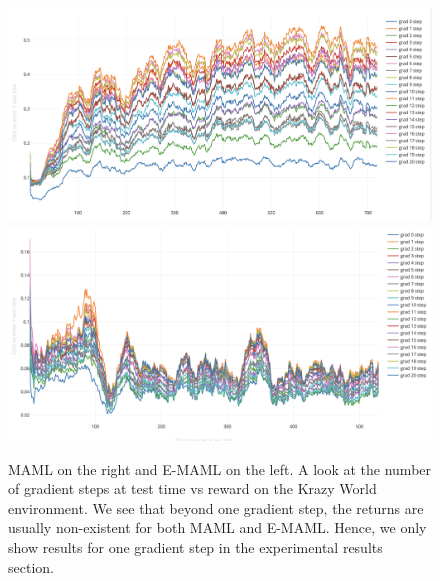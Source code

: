 \documentclass{article} %
\begin{document}
\begin{figure}[H]
\begin{center}
\includegraphics[scale=0.16]{bradly_curves/emaml-20-0.png}%
\includegraphics[scale=0.16]{bradly_curves/maml-20-0.png}
\end{center}
\caption{MAML on the right and E-MAML on the left. A look at the number of gradient steps at test time vs reward on the Krazy World environment. We see that beyond one gradient step, the returns are usually non-existent for both MAML and E-MAML. Hence, we only show results for one gradient step in the experimental results section.}
\label{fig:maml-grad-steps}
\end{figure} 



\end{document}
